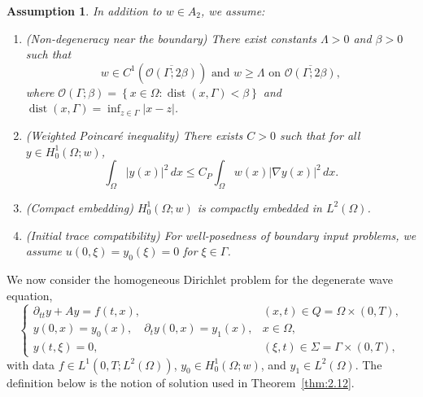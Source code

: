 \documentclass[10pt,a4paper]{amsart}
\newtheorem{assumption}{Assumption}
\def\Ga{\Gamma}
\def\La{\Lambda}
\def\Om{\Omega}
\def\be{\beta}
\DeclareMathOperator{\dist}{dist}
\def\mcO{\mathcal{O}}
\def\ol{\overline}
\begin{document}
\begin{assumption}\label{06.27.A1}\label{ass:2.2}
In addition to $w\in A_2$, we assume:
\begin{enumerate}
  \item (\textit{Non-degeneracy near the boundary}) There exist constants $\Lambda>0$ and $\beta>0$ such that
	\begin{equation}\label{08.13.1}
		w\in C^1(\ol{\mcO(\Ga;2\be)}) \mbox{ and } w\geq \La \mbox{ on } \ol{\mcO(\Ga;2\beta)},
	\end{equation}
	where $\mcO(\Ga;\beta)=\left\{x\in\Om\colon \dist(x,\Ga)<\beta\right\}$ and $\dist(x,\Ga)=\inf_{z\in \Ga}|x-z|$.
  \item (\textit{Weighted Poincar\'e inequality}) There exists $C>0$ such that for all $y\in H^1_0(\Omega;w)$,
\[
\int_{\Omega} |y(x)|^2\, dx \le C_P \int_{\Omega} w(x)|\nabla y(x)|^2\, dx.
\]

  \item (\textit{Compact embedding}) $H^1_0(\Omega;w)$ is compactly embedded in $L^2(\Omega)$.

  \item (\textit{Initial trace compatibility}) For well-posedness of boundary input problems, we assume $u(0,\xi) = y_0(\xi) = 0$ for $\xi\in \Gamma$.
\end{enumerate}
\end{assumption}

We now consider the homogeneous Dirichlet problem for the degenerate wave equation,
\begin{equation}
\begin{cases}
\partial_{tt}y + Ay = f(t,x), & (x,t)\in Q=\Omega\times(0,T),\\
y(0,x) = y_0(x),\quad \partial_t y(0,x) = y_1(x), & x\in \Omega,\\
y(t,\xi) = 0, & (\xi,t)\in \Sigma=\Gamma\times(0,T),
\end{cases}
\label{09.17.1}
\end{equation}
with data $f\in L^1(0,T;L^2(\Omega))$, $y_0\in H^1_0(\Omega;w)$, and $y_1\in L^2(\Omega)$. The definition below is the notion of solution used in Theorem~\ref{thm:2.12}.
\end{document}
